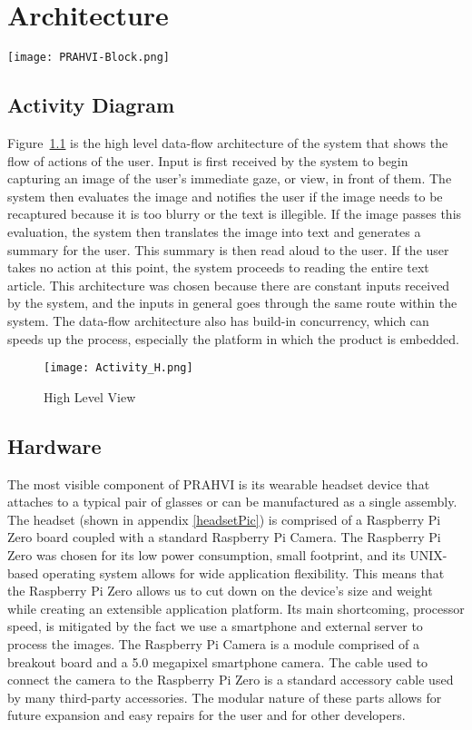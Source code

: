 \chapter{Architecture}

\texttt{[image: PRAHVI-Block.png]}

\section{Activity Diagram}
Figure~\ref{activityDiagram} is the high level data-flow architecture of the system that shows the flow of actions of the user. Input is first received by the system to begin capturing an image of the user's immediate gaze, or view, in front of them. The system then evaluates the image and notifies the user if the image needs to be recaptured because it is too blurry or the text is illegible. If the image passes this evaluation, the system then translates the image into text and generates a summary for the user. This summary is then read aloud to the user. If the user takes no action at this point, the system proceeds to reading the entire text article. This architecture was chosen because there are constant inputs received by the system, and the inputs in general goes through the same route within the system. The data-flow architecture also has build-in concurrency, which can speeds up the process, especially the platform in which the product is embedded.

\begin{figure}
	\centering
    \texttt{[image: Activity\_H.png]}%
    
    \caption{High Level View}
	\label{activityDiagram}
\end{figure}

\section{Hardware}
The most visible component of PRAHVI is its wearable headset device that attaches to a typical pair of glasses or can be manufactured as a single assembly. The headset (shown in appendix \ref{headsetPic}) is comprised of a Raspberry Pi Zero board coupled with a standard Raspberry Pi Camera. The Raspberry Pi Zero was chosen for its low power consumption, small footprint, and its UNIX-based operating system allows for wide application flexibility. This means that the Raspberry Pi Zero allows us to cut down on the device's size and weight while creating an extensible application platform. Its main shortcoming, processor speed, is mitigated by the fact we use a smartphone and external server to process the images. The Raspberry Pi Camera is a module comprised of a breakout board and a 5.0 megapixel smartphone camera. The cable used to connect the camera to the Raspberry Pi Zero is a standard accessory cable used by many third-party accessories. The modular nature of these parts allows for future expansion and easy repairs for the user and for other developers. 

